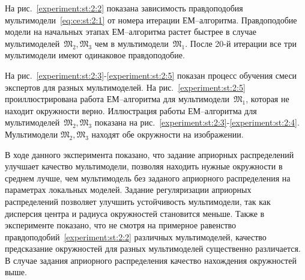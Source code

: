 \documentclass[12pt, twoside]{article}
\numberwithin{equation}{section}
\begin{document}
На рис.~\ref{experiment:st:2:2} показана зависимость правдоподобия мультимодели~\eqref{eq:ce:st:2:1} от номера итерации ЕМ--алгоритма. Правдоподобие модели на начальных этапах ЕМ--алгоритма растет быстрее в случае мультимоделей~$\mathfrak{M}_2, \mathfrak{M}_3$ чем в мультимодели~$\mathfrak{M}_1$. После 20-й итерации все три мультимодели имеют одинаковое правдоподобие.

На рис.~\ref{experiment:st:2:3}-\ref{experiment:st:2:5} показан процесс обучения смеси экспертов для разных мультимоделей. На рис.~\ref{experiment:st:2:5} проиллюстрирована работа ЕМ--алгоритма для мультимодели~$\mathfrak{M}_1$, которая не находит окружности верно. Иллюстрация работы ЕМ--алгоритма для мультимоделей~$\mathfrak{M}_2, \mathfrak{M}_3$ показана на рис.~\ref{experiment:st:2:3}-\ref{experiment:st:2:4}. Мультимодели $\mathfrak{M}_2, \mathfrak{M}_3$ находят обе окружности на изображении.

В ходе данного эксперимента показано, что задание априорных распределений улучшает качество мультимодели, позволяя находить нужные окружности в среднем лучше, чем мультимодель без заданого априорного распределения на параметрах локальных моделей. Задание регуляризации априорных распределений позволяет улучшить устойчивость мультимодели, так как дисперсия центра и радиуса окружностей становится меньше.
Также в эксперименте показано, что не смотря на примерное равенство правдоподобий~\eqref{experiment:st:2:2} различных мультимоделей, качество предсказание окружностей для разных мультимоделей существенно различается. В случае задания априорного распределения качество нахождения окружностей выше.
\end{document}
